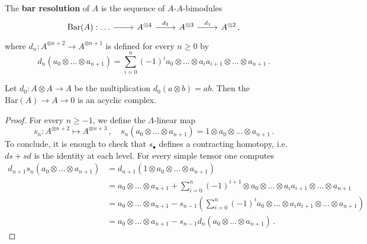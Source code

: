 	\begin{df}
		The \textbf{bar resolution} of $A$ is the sequence of $A$-$A$-bimodules
		\begin{equation*}
			\begin{tikzcd}
				\mathrm{Bar}(A) : \dots \ar[r] 
				& A^{\otimes 4} \ar[r, "d_{2}"]
				& A^{\otimes 3} \ar[r, "d_{1}"]
				& A^{\otimes 2}\,, %
			\end{tikzcd}
		\end{equation*}
		where $d_{n}:A^{\otimes n+2} \to A^{\otimes n+1}$ 
		is defined for every $n \ge 0$ by
		\begin{equation}\label{HHA-boundary}
			d_{n}(a_{0} \otimes \dots \otimes a_{n+1})
			= \sum_{i=0}^{n} (-1)^{i} a_{0} \otimes \dots \otimes a_{i}a_{i+1}
			\otimes \dots \otimes a_{n+1}\,.
		\end{equation}
	\end{df}
	
	\begin{lemma}
		Let $d_{0}:A \otimes A \to A$ be the multiplication $d_{0}(a \otimes b)=ab$.
		Then the $\mathrm{Bar}(A) \to A \to 0$ is an acyclic complex.
		\begin{proof}
			For every $n \ge -1$, we define the $\Lambda$-linear map
			\begin{equation*}
				s_{n} : A^{\otimes n+2} \longmapsto A^{\otimes n+3}\,,
				\quad s_{n}\left( a_{0} \otimes \dots \otimes a_{n+1} \right)
				= 1 \otimes a_{0} \otimes \dots \otimes a_{n+1}\,.
			\end{equation*}
			To conclude, it is enough to check that $s_{\bullet}$
			defines a contracting homotopy, 
			i.e. $ds + sd$ is the identity at each level.
			For every simple tensor one computes
			\begin{align*}
				d_{n+1}s_{n}\left( a_{0} \otimes \dots \otimes a_{n+1} \right)
				&= d_{n+1}\left(1 \otimes a_{0} \otimes \dots \otimes a_{n+1} \right) \\
				&=  a_{0} \otimes \dots \otimes a_{n+1}
				+ \sum_{i=0}^{n} (-1)^{i+1} \otimes a_{0} \otimes \dots \otimes a_{i}a_{i+1}
				\otimes \dots \otimes a_{n+1} \\
				&= a_{0} \otimes \dots \otimes a_{n+1}
				- s_{n-1}\left( \sum_{i=0}^{n} (-1)^{i} a_{0} \otimes \dots \otimes a_{i}a_{i+1}
				\otimes \dots \otimes a_{n+1} \right) \\
				&= a_{0} \otimes \dots \otimes a_{n+1}
				- s_{n-1}d_{n}(a_{0} \otimes \dots \otimes a_{n+1})\,.
			\end{align*}\qedhere
		\end{proof}
	\end{lemma}
	
